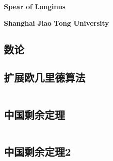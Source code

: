 \documentclass[landscape, oneside, a4paper, cs4size]{book}
\newcommand{\cppcode}[1]{
	\inputminted[mathescape,
	frame=lines,linenos]{cpp}{source/#1}
}
\begin{document}
\scriptsize
	
	\begin{center}
		\textbf{\LARGE{Spear of Longinus}}
		
		
		\textbf{\small{Shanghai Jiao Tong University}}
	\end{center}
	
	\begin{multicols}{2}
		\tableofcontents
		\clearpage
		\begin{spacing}{0.8}
			

\section{数论}



\subsection{扩展欧几里德算法}


\cppcode{number-theory/extended-euclid.cpp}


\subsection{中国剩余定理}

\cppcode{number-theory/chinese-remainder-theorem.cpp}


\subsection{中国剩余定理2}

\cppcode{number-theory/china2.cpp}






\end{spacing}
\end{multicols}
\end{document}
